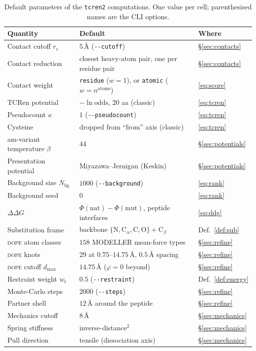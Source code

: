 \documentclass[11pt]{article}
\theoremstyle{oldplain}
\theoremstyle{oldrem}
\begin{document}
\begin{table}[ht]\centering\small
\caption{Default parameters of the \texttt{tcren2} computations. One value per cell; parenthesised names
are the CLI options.}
\label{tab:params}
\begin{tabular}{@{}lll@{}}
\toprule
Quantity & Default & Where \\
\midrule
Contact cutoff $r_c$ & $5\,\text{\AA}$ (\texttt{-{}-cutoff}) & \S\ref{sec:contacts} \\
Contact reduction & closest heavy-atom pair, one per residue pair & \S\ref{sec:contacts} \\
Contact weight & \texttt{residue} ($w{=}1$), or \texttt{atomic} ($w{=}n^{\mathrm{atoms}}$) & \eqref{eq:score} \\
TCRen potential & $-\ln\mathrm{odds}$, 20 aa (classic) & \eqref{eq:tcren} \\
Pseudocount $\kappa$ & $1$ (\texttt{-{}-pseudocount}) & \eqref{eq:tcren} \\
Cysteine & dropped from ``from'' axis (classic) & \eqref{eq:tcren} \\
am-variant temperature $\beta$ & $44$ & \S\ref{sec:potentials} \\
Presentation potential & Miyazawa--Jernigan (Keskin) & \S\ref{sec:potentials} \\
Background size $N_{\mathrm{bg}}$ & $1000$ (\texttt{-{}-background}) & \eqref{eq:rank} \\
Background seed & $0$ & \eqref{eq:rank} \\
$\Delta\Delta G$ & $\Phi(\text{nat})-\Phi(\text{mut})$, peptide interfaces & \eqref{eq:ddg} \\
Substitution frame & backbone $\{\mathrm N,\mathrm C_\alpha,\mathrm C,\mathrm O\}+\mathrm C_\beta$ & Def.~\ref{def:sub} \\
\textsc{dope} atom classes & $158$ MODELLER mean-force types & \S\ref{sec:refine} \\
\textsc{dope} knots & $29$ at $0.75$--$14.75\,\text{\AA}$, $0.5\,\text{\AA}$ spacing & \S\ref{sec:refine} \\
\textsc{dope} cutoff $d_{\max}$ & $14.75\,\text{\AA}$ ($\varphi{=}0$ beyond) & \S\ref{sec:refine} \\
Restraint weight $w_{\mathrm r}$ & $0.5$ (\texttt{-{}-restraint}) & Def.~\ref{def:energy} \\
Monte-Carlo steps & $2000$ (\texttt{-{}-steps}) & \S\ref{sec:refine} \\
Partner shell & $12\,\text{\AA}$ around the peptide & \S\ref{sec:refine} \\
Mechanics cutoff & $8\,\text{\AA}$ & \S\ref{sec:mechanics} \\
Spring stiffness & inverse-distance$^2$ & \S\ref{sec:mechanics} \\
Pull direction & tensile (dissociation axis) & \S\ref{sec:mechanics} \\
\bottomrule
\end{tabular}
\end{table}
\end{document}
